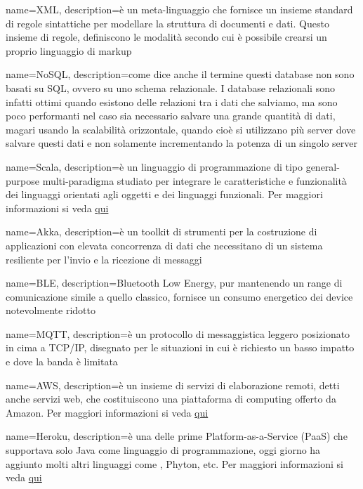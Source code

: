  {
	name=XML,
	description={è un meta-linguaggio che fornisce un insieme standard di regole sintattiche per modellare la struttura di documenti e dati. Questo insieme di regole, definiscono le modalità secondo cui è possibile crearsi un proprio linguaggio di markup}
}

 {
	name=NoSQL,
	description={come dice anche il termine questi database non sono basati su SQL, ovvero su uno schema relazionale. I database relazionali sono infatti ottimi quando esistono delle relazioni tra i dati che salviamo, ma sono poco performanti nel caso sia necessario salvare una grande quantità di dati, magari usando la scalabilità orizzontale, quando cioè si utilizzano più server dove salvare questi dati e non solamente incrementando la potenza di un singolo server}
}

 {
	name=Scala,
	description={è un linguaggio di programmazione di tipo general-purpose multi-paradigma studiato per integrare le caratteristiche e funzionalità dei linguaggi orientati agli oggetti e dei linguaggi funzionali. Per maggiori informazioni si veda \href{https://it.wikipedia.org/wiki/Scala_(linguaggio_di_programmazione)}{qui}}
}

 {
	name=Akka,
	description={è un toolkit di strumenti per la costruzione di applicazioni con elevata concorrenza di dati che necessitano di un sistema resiliente per l'invio e la ricezione di messaggi}
}

 {
	name=BLE,
	description={Bluetooth Low Energy,  pur mantenendo un range di comunicazione simile a quello classico, fornisce un  consumo energetico dei device notevolmente ridotto}
}

 {
	name=MQTT,
	description={è un protocollo di messaggistica leggero posizionato in cima a TCP/IP, disegnato per le situazioni in cui è richiesto un basso impatto e dove la banda è limitata }
}

 {
	name=AWS,
	description={è un insieme di servizi di elaborazione remoti, detti anche servizi web, che costituiscono una piattaforma di computing offerto da Amazon. Per maggiori informazioni si veda \href{https://aws.amazon.com/it/}{qui}}
}

 {
	name=Heroku,
	description={è una  delle prime  Platform-as-a-Service (PaaS) che supportava solo Java come linguaggio di programmazione, oggi giorno ha aggiunto molti altri linguaggi come , Phyton, etc. Per maggiori informazioni si veda \href{https://www.heroku.com}{qui}}
}

